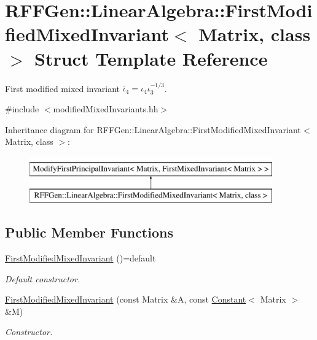 \hypertarget{structRFFGen_1_1LinearAlgebra_1_1FirstModifiedMixedInvariant}{\section{R\-F\-F\-Gen\-:\-:Linear\-Algebra\-:\-:First\-Modified\-Mixed\-Invariant$<$ Matrix, class $>$ Struct Template Reference}
\label{structRFFGen_1_1LinearAlgebra_1_1FirstModifiedMixedInvariant}
}


First modified mixed invariant $\bar\iota_4=\iota_4\iota_3^{-1/3}$.  




{\ttfamily \#include $<$modified\-Mixed\-Invariants.\-hh$>$}

Inheritance diagram for R\-F\-F\-Gen\-:\-:Linear\-Algebra\-:\-:First\-Modified\-Mixed\-Invariant$<$ Matrix, class $>$\-:\begin{figure}[H]
\begin{center}
\leavevmode
\includegraphics[height=2.000000cm]{structRFFGen_1_1LinearAlgebra_1_1FirstModifiedMixedInvariant}
\end{center}
\end{figure}
\subsection*{Public Member Functions}
\begin{DoxyCompactItemize}
\item 
\hypertarget{structRFFGen_1_1LinearAlgebra_1_1FirstModifiedMixedInvariant_a81fca73557d2c6bc0cd773bd9431cb64}{\hyperlink{structRFFGen_1_1LinearAlgebra_1_1FirstModifiedMixedInvariant_a81fca73557d2c6bc0cd773bd9431cb64}{First\-Modified\-Mixed\-Invariant} ()=default}\label{structRFFGen_1_1LinearAlgebra_1_1FirstModifiedMixedInvariant_a81fca73557d2c6bc0cd773bd9431cb64}

\begin{DoxyCompactList}\small\item\em Default constructor. \end{DoxyCompactList}\item 
\hyperlink{structRFFGen_1_1LinearAlgebra_1_1FirstModifiedMixedInvariant_a8b88a33160220e42121a05876a27d480}{First\-Modified\-Mixed\-Invariant} (const Matrix \&A, const \hyperlink{structRFFGen_1_1Constant}{Constant}$<$ Matrix $>$ \&M)
\begin{DoxyCompactList}\small\item\em Constructor. \end{DoxyCompactList}\end{DoxyCompactItemize}



